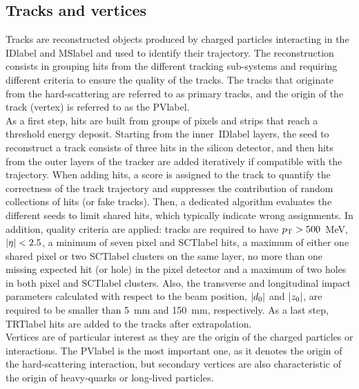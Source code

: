 \subsection{Tracks and vertices}

Tracks are reconstructed objects produced by charged particles interacting in the \acrshort{IDlabel} and \acrshort{MSlabel} and used to identify their trajectory. The reconstruction consists in grouping hits from the different tracking sub-systems and requiring different criteria to ensure the quality of the tracks. The tracks that originate from the hard-scattering are referred to as primary tracks, and the origin of the track (vertex) is referred to as the \acrfull{PVlabel}.\\

As a first step, hits are built from groups of pixels and strips that reach a threshold energy deposit. Starting from the inner~\acrshort{IDlabel} layers, the seed to reconstruct a track consists of three hits in the silicon detector, and then hits from the outer layers of the tracker are added iteratively if compatible with the trajectory. When adding hits, a score is assigned to the track to quantify the correctness of the track trajectory and suppresses the contribution of random collections of hits (or fake tracks). Then, a dedicated algorithm evaluates the different seeds to limit shared hits, which typically indicate wrong assignments. In addition, quality criteria are applied: tracks are required to have $p_{\text{T}}>500$~MeV, $\abs{\eta}<2.5$, a minimum of seven pixel and \acrshort{SCTlabel} hits, a maximum of either one shared pixel or two \acrshort{SCTlabel} clusters on the same layer, no more than one missing expected hit (or hole) in the pixel detector and a maximum of two holes in both pixel and \acrshort{SCTlabel} clusters. Also, the transverse and longitudinal impact parameters calculated with respect to the beam position, $\abs{d_0}$ and $\abs{z_0}$, are required to be smaller than 5~mm and 150~mm, respectively. As a last step, \acrshort{TRTlabel} hits are added to the tracks after extrapolation.\\

Vertices are of particular interest as they are the origin of the charged particles or interactions. The \acrshort{PVlabel} is the most important one, as it denotes the origin of the hard-scattering interaction, but secondary vertices are also characteristic of the origin of heavy-quarks or long-lived particles.\\


